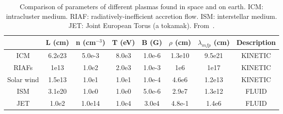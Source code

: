 \begin{table}
  \begin{tabular}{c|c|c|c|c|c|c|c}  
    & L (cm) & n (cm$^{-3}$) & T (eV) & B (G) & $\rho$ (cm) & $\lambda_{mfp}$ (cm) & Description \\ \hline\hline
    ICM & 6.2e23 & 5.0e-3 & 8.0e3 & 1.0e-6 & 1.3e10 & 9.5e21 & KINETIC \\ 
    RIAFs & 1e13 & 1.0e2 & 2.0e3 & 1.0e-3 & 1e6 & 1e17 & KINETIC \\ 
    Solar wind & 1.5e13 & 1.0e1 & 1.0e1 & 1.0e-4 & 4.6e6 & 1.2e13 & KINETIC  \\ \hline
    ISM & 3.1e20 & 1.0e0 & 1.0e0 & 5.0e-6 & 2.9e7 & 1.3e12 & FLUID \\ 
    JET & 1.0e2 & 1.0e14 & 1.0e4 & 3.0e4 & 4.8e-1 & 1.4e6 & FLUID  \\ 
  \end{tabular}
  \caption{Comparison of parameters of different plasmas found in space and on earth. ICM: intracluster medium. RIAF: radiatively-inefficient accretion flow. ISM: interstellar medium. JET: Joint European Torus (a tokamak). From~\cite{KunzFM,AST521Pset1}.}
  \label{table:paramCompare}
\end{table}

